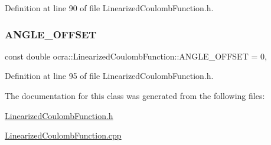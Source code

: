 Definition at line 90 of file Linearized\+Coulomb\+Function.\+h.

\hypertarget{classocra_1_1LinearizedCoulombFunction_a1778e1ecca6c7d54f846a750f9a06552}{}\label{classocra_1_1LinearizedCoulombFunction_a1778e1ecca6c7d54f846a750f9a06552} 
\subsubsection{\texorpdfstring{A\+N\+G\+L\+E\+\_\+\+O\+F\+F\+S\+ET}{ANGLE\_OFFSET}}
{\footnotesize\ttfamily const double ocra\+::\+Linearized\+Coulomb\+Function\+::\+A\+N\+G\+L\+E\+\_\+\+O\+F\+F\+S\+ET = 0\hspace{0.3cm}{\ttfamily [static]}, {\ttfamily [protected]}}



Definition at line 95 of file Linearized\+Coulomb\+Function.\+h.



The documentation for this class was generated from the following files\+:\begin{DoxyCompactItemize}
\item 
\hyperlink{LinearizedCoulombFunction_8h}{Linearized\+Coulomb\+Function.\+h}\item 
\hyperlink{LinearizedCoulombFunction_8cpp}{Linearized\+Coulomb\+Function.\+cpp}\end{DoxyCompactItemize}
